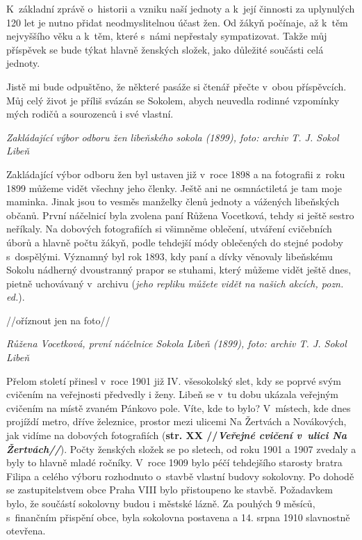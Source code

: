 \documentclass[a5paper, 12pt, twoside]{article}
\begin{document}
K~základní zprávě o~historii a vzniku naší jednoty a k~její činnosti za
uplynulých 120 let je nutno přidat neodmyslitelnou účast žen. Od žákyň
počínaje, až k~těm nejvyššího věku a k~těm, které s~námi nepřestaly
sympatizovat. Takže můj příspěvek se bude týkat hlavně ženských složek,
jako důležité součásti celá jednoty.

Jistě mi bude odpuštěno, že některé pasáže si čtenář přečte v~obou
příspěvcích. Můj celý život je příliš svázán se Sokolem, abych neuvedla
rodinné vzpomínky mých rodičů a sourozenců i své vlastní.


\textit{Zakládající výbor odboru žen libeňského sokola (1899), foto:
archiv T. J. Sokol Libeň}

Zakládající výbor odboru žen byl ustaven již v~roce 1898 a na fotografii
z~roku 1899 můžeme vidět všechny jeho členky. Ještě ani ne osmnáctiletá
je tam moje maminka. Jinak jsou to vesměs manželky členů jednoty a
vážených libeňských občanů. První náčelnicí byla zvolena paní Růžena
Vocetková, tehdy si ještě sestro neříkaly. Na dobových fotografiích si
všimněme oblečení, utváření cvičebních úborů a hlavně počtu žákyň, podle
tehdejší módy oblečených do stejné podoby s~dospělými. Významný byl rok
1893, kdy paní a dívky věnovaly libeňskému Sokolu nádherný dvoustranný
prapor se stuhami, který můžeme vidět ještě dnes, pietně uchovávaný
v~archivu (\textit{jeho repliku můžete vidět na našich akcích, pozn. ed.}).


//oříznout jen na foto//

\textit{Růžena Vocetková, první náčelnice Sokola Libeň (1899), foto:
archiv T. J. Sokol Libeň}

Přelom století přinesl v~roce 1901 již IV. všesokolský slet, kdy se
poprvé svým cvičením na veřejnosti předvedly i ženy. Libeň se v~tu dobu
ukázala veřejným cvičením na místě zvaném Pánkovo pole. Víte, kde to
bylo? V~místech, kde dnes projíždí metro, dříve železnice, prostor mezi
ulicemi Na Žertvách a Novákových, jak vidíme na dobových fotografiích
(\textbf{str. XX //\textit{Veřejné cvičení v~ulici Na Žertvách//}}).
Počty ženských složek se po sletech, od roku 1901 a 1907 zvedaly a byly
to hlavně mladé ročníky. V~roce 1909 bylo péčí tehdejšího starosty
bratra Filipa a celého výboru rozhodnuto o~stavbě vlastní budovy
sokolovny. Po dohodě se zastupitelstvem obce Praha VIII bylo přistoupeno
ke stavbě. Požadavkem bylo, že součástí sokolovny budou i městské lázně.
Za pouhých 9 měsíců, s~finančním přispění obce, byla sokolovna postavena
a 14. srpna 1910 slavnostně otevřena.
\end{document}
